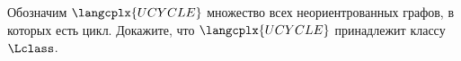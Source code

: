 Обозначим $\langcplx{UCYCLE}$ множество всех неориентрованных графов, в которых есть цикл. Докажите, что
$\langcplx{UCYCLE}$ принадлежит классу $\Lclass$.
